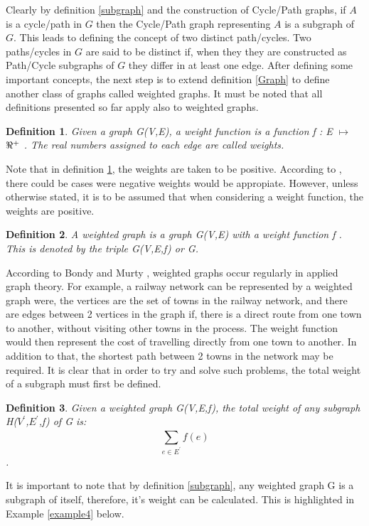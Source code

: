 \documentclass{article}
\newtheorem{definition}{Definition}[subsection]
\begin{document}
Clearly by definition \ref{subgraph} and the construction of Cycle/Path graphs, if $A$ is a cycle/path in $G$ then the Cycle/Path graph representing $A$ is a subgraph of $G$. This leads to defining the concept of two distinct path/cycles. Two paths/cycles in $G$ are said to be distinct if, when they they are constructed as Path/Cycle subgraphs of $G$ they differ in at least one edge. After defining some important concepts, the next step is to extend definition \ref{Graph} to define another class of graphs called weighted graphs. It must be noted that all definitions presented so far apply also to weighted graphs.
\begin{definition}
\label{Weighted Function}
Given a graph G(V,E), a weight function is a function f : E $\mapsto$ $\real^+$ {}. The real numbers assigned to each edge are called weights.
\end{definition}
Note that in definition \ref{Weighted Function}, the weights are taken to be positive. According to \cite{harris_hirst_mossinghoff_2008}, there could be cases were negative weights would be appropiate. However, unless otherwise stated, it is to be assumed that when considering a weight function, the weights are positive.
\begin{definition}
\label{Weighted Graph}
A weighted graph is a graph G(V,E) with a weight function f {}. This is denoted by the triple G(V,E,f) or G. 
\end{definition}
According to Bondy and Murty \cite{bondy_murty_1982}, weighted graphs occur regularly in applied graph theory. For example, a railway network can be represented by a weighted graph were, the vertices are the set of towns in the railway network, and there are edges between 2 vertices in the graph if, there is a direct route from one town to another, without visiting other towns in the process. The weight function would then represent the cost of travelling directly from one town to another. In addition to that, the shortest path between 2 towns in the network may be required. It is clear that in order to try and solve such problems, the total weight of a subgraph must first be defined.
\begin{definition}
\label{weightofasubgraph}
Given a weighted graph G(V,E,f), the total weight of any subgraph  H($V^\prime$,$E^\prime$,f) of G is: $$\sum_{e \in E^\prime}^{} f(e) $$. 
\end{definition}
It is important to note that by definition \ref{subgraph}, any weighted graph G is a subgraph of itself, therefore, it's weight can be calculated. This is highlighted in Example \ref{example4} below.
\end{document}
